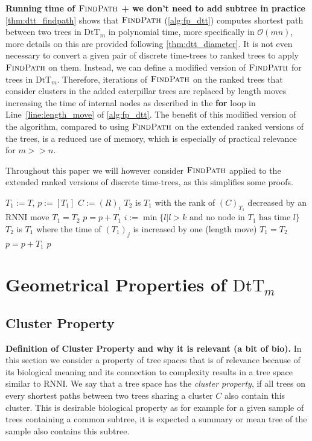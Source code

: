 \documentclass[11pt]{amsart}
\newcommand{\rnni}{\mathrm{RNNI}}
\newcommand{\findpath}{\textsc{FindPath}}
\newcommand{\rank}{\mathrm{rank}}
\newcommand{\dtt}{\mathrm{DtT}}
\renewcommand{\O}{\mathcal O}
\newcommand{\summary}[1]{\textbf{#1}} %
\begin{document}
\summary{Running time of $\findpath$ + we don't need to add subtree in practice}
\autoref{thm:dtt_findpath} shows that $\findpath$ (\autoref{alg:fp_dtt}) computes shortest path between two trees in $\dtt_m$ in polynomial time, more specifically in $\O(mn)$, more details on this are provided following \autoref{thm:dtt_diameter}.
It is not even necessary to convert a given pair of discrete time-trees to ranked trees to apply $\findpath$ on them.
Instead, we can define a modified version of $\findpath$ for trees in $\dtt_m$.
Therefore, iterations of $\findpath$ on the ranked trees that consider clusters in the added caterpillar trees are replaced by length moves increasing the time of internal nodes as described in the \textbf{for} loop in Line~\ref{line:length_move} of \autoref{alg:fp_dtt}.
The benefit of this modified version of the algorithm, compared to using $\findpath$ on the extended ranked versions of the trees, is a reduced use of memory, which is especially of practical relevance for $m >> n$.

Throughout this paper we will however consider $\findpath$ applied to the extended ranked versions of discrete time-trees, as this simplifies some proofs.

\begin{algorithm}[h]
	\caption{$\findpath$($T,R$)}
	\begin{algorithmic}[1]
		\label{alg:fp_dtt}
		\STATE $T_1 := T$, $p := [T_1]$
			\STATE $C:=(R)_i$
			\WHILE {$\rank((C)_{T_1})>k$}
					\STATE $T_2$ is $T_1$ with the rank of $(C)_{T_1}$ decreased by an $\rnni$ move
				\STATE $T_1 = T_2$
				\STATE $p = p+T_1$
			\ENDWHILE
			\ELSE
				\STATE $i := \min\{l | l>k \text{ and no node in } T_1 \text{ has time }l\}$
					\label{line:length_move}
					\STATE $T_2$ is $T_1$ where the time of $(T_1)_j$ is increased by one (length move)
					\STATE $T_1 = T_2$
					\STATE $p = p+T_1$
				\ENDFOR
			\ENDIF
		\ENDFOR
		\RETURN $p$
	\end{algorithmic}
\end{algorithm}


\section{Geometrical Properties of $\dtt_m$}

\subsection{Cluster Property}
\summary{Definition of Cluster Property and why it is relevant (a bit of bio).}
In this section we consider a property of tree spaces that is of relevance because of its biological meaning and its connection to complexity results in a tree space similar to $\rnni$.
We say that a tree space has the \emph{cluster property}, if all trees on every shortest paths between two trees sharing a cluster $C$ also contain this cluster.
This is desirable biological property as for example for a given sample of trees containing a common subtree, it is expected a summary or mean tree of the sample also contains this subtree.
\end{document}

